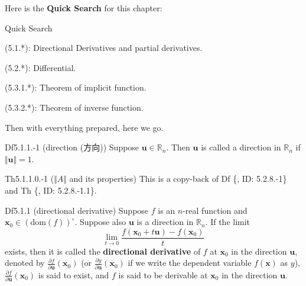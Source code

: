 \documentclass{article}
\newcommand{\parfrac}[2]{\frac{\partial #1}{\partial #2}}
\begin{document}
Here is the \textbf{Quick Search} for this chapter:
\begin{Th}{Quick Search}
    \begin{compactdesc}
        \item (5.1.*): Directional Derivatives and partial derivatives.
        \item (5.2.*): Differential.
        \item (5.3.1.*): Theorem of implicit function.
        \item (5.3.2.*): Theorem of inverse function.
    \end{compactdesc}
\end{Th}

Then with everything prepared, here we go.

\begin{Df}{Df5.1.1.-1 (direction (方向))}
    Suppose $\pmb{u}\in\mathbb{R}_n$. Then $\pmb{u}$ is called a direction in $\mathbb{R}_n$ if $\Vert \pmb{u}\Vert = 1$.
\end{Df}

\begin{Th}{Th5.1.1.0.-1 ($\Vert A\Vert$ and its properties)}
    This is a copy-back of Df \{, ID: 5.2.8.-1\} and Th \{, ID: 5.2.8.-1.1\}.
\end{Th}

\begin{Df}{Df5.1.1 (directional derivative)}
    Suppose $f$ is an $n$-real function and $\pmb{x}_0\in (\text{dom}(f))^\circ$. Suppose also $\pmb{u}$ is a direction in $\mathbb{R}_n$. If the limit
    $$\lim_{t\to 0}\frac{f(\pmb{x}_0 + t\pmb{u}) - f(\pmb{x}_0)}{t}$$ 
    exists, then it is called the \textbf{directional derivative} of $f$ at $\pmb{x}_0$ in the direction $\pmb{u}$, denoted by $\parfrac{f}{\pmb{u}}(\pmb{x}_0)$ (or $\parfrac{y}{\pmb{u}}(\pmb{x}_0)$ if we write the dependent variable $f(\pmb{x})$ as $y$), $\parfrac{f}{\pmb{u}}(\pmb{x}_0)$ is said to exist, and $f$ is said to be derivable at $\pmb{x}_0$ in the direction $\pmb{u}$.
\end{Df}
\end{document}

